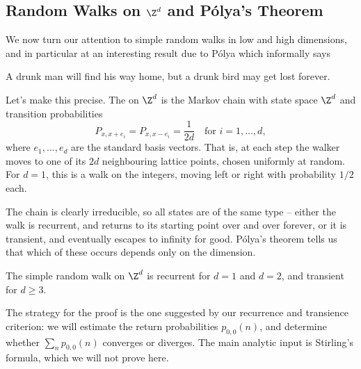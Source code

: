 \subsection{Random Walks on \texorpdfstring{$\Z^d$}{Zd} and Pólya's Theorem}

We now turn our attention to simple random walks in low and high dimensions, and in particular at an interesting result due to Pólya which informally says

\begin{center}
	{\color{blue} A drunk man will find his way home, but a drunk bird may get lost forever.}
\end{center}

Let's make this precise. The  on $\Z^d$ is the Markov chain with state space $\Z^d$ and transition probabilities
$$
P_{x, x + e_i} = P_{x, x - e_i} = \frac{1}{2d} \quad \text{for } i = 1, \dots, d,
$$
where $e_1, \dots, e_d$ are the standard basis vectors. That is, at each step the walker moves to one of its $2d$ neighbouring lattice points, chosen uniformly at random. For $d = 1$, this is a walk on the integers, moving left or right with probability $1/2$ each.

\begin{center}
\end{center}

The chain is clearly irreducible, so all states are of the same type -- either the walk is recurrent, and returns to its starting point over and over forever, or it is transient, and eventually escapes to infinity for good. Pólya's theorem tells us that which of these occurs depends only on the dimension.

\begin{theorem}
	The simple random walk on $\Z^d$ is recurrent for $d = 1$ and $d = 2$, and transient for $d \geq 3$.
\end{theorem}

The strategy for the proof is the one suggested by our recurrence and transience criterion: we will estimate the return probabilities $p_{0,0}(n)$, and determine whether $\sum_n p_{0, 0}(n)$ converges or diverges. The main analytic input is Stirling's formula, which we will not prove here.

